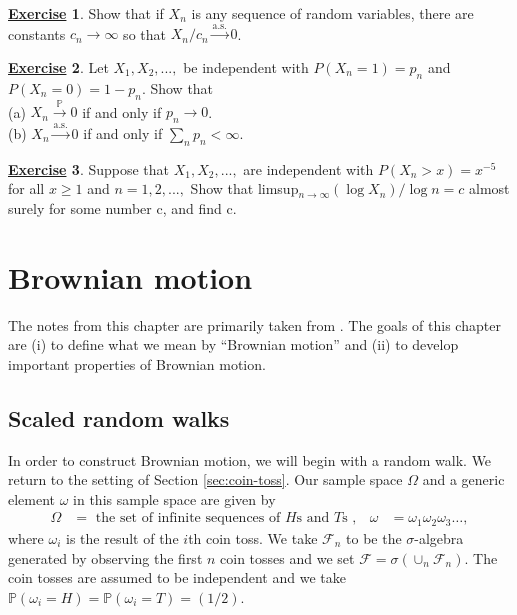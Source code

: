 \documentclass[12pt]{book}
\numberwithin{equation}{chapter}
\theoremstyle{plain}
\numberwithin{theorem}{section}
\theoremstyle{definition}
\newtheorem{exercise}{\underline{Exercise}}
\numberwithin{exercise}{chapter}
\newcommand{\<}{\langle}
\renewcommand{\>}{\rangle}
\renewcommand{\(}{\left(}
\renewcommand{\)}{\right)}
\renewcommand{\[}{\left[}
\renewcommand{\]}{\right]}
\newcommand\Pb{\mathds{P}}
\newcommand\Fc{\mathscr{F}}
\newcommand\om{\omega}
\newcommand\Om{\Omega}
\newcommand\sig{\sigma}
\begin{document}
\begin{exercise}
\label{exer:6.5}
Show that if $X_n$ is any sequence of random variables, there are constants $c_n \rightarrow \infty$ so that $X_n/c_n \stackrel{\text{a.s.}}{\rightarrow} 0$.  
\end{exercise}

\begin{exercise}
\label{exer:6.6}
Let $X_1, X_2, ...,$ be independent with $P(X_n = 1) = p_n$ and $P(X_n=0) = 1-p_n$. Show that\\
(a) $X_n \stackrel{\Pb}{\rightarrow} 0$ if and only if $p_n \rightarrow 0$.\\
(b) $X_n \stackrel{\text{a.s.}}{\rightarrow} 0$ if and only if $\sum_n p_n < \infty $.
\end{exercise}

\begin{exercise}
\label{exer:6.7}
Suppose that $X_1, X_2, ..., $ are independent with $P(X_n > x) = x^{-5}$ for all $x\geq 1$ and $n = 1,2, ...,$ Show that  limsup$_{n\rightarrow \infty} (\log X_n)/ \log n = c$ almost surely for some number c, and find c. 
\end{exercise}

%
%


\chapter{Brownian motion}
\label{chapter:bm}
The notes from this chapter are primarily taken from \cite[Chapter 3]{shreve2004}.  The goals of this chapter are (i) to define what we mean by ``Brownian motion'' and (ii) to develop important properties of Brownian motion.


\section{Scaled random walks}
\label{sec:random.walks}
In order to construct Brownian motion, we will begin with a random walk.  We return to the setting of Section \ref{sec:coin-toss}.  Our sample space $\Om$ and a generic element $\om$ in this sample space are given by
\begin{align}
\Om
	&=	\text{ the set of infinite sequences of $H$s and $T$s }, &
\om
	&=	\om_1 \om_2 \om_3 \ldots ,
\end{align}
where $\om_i$ is the result of the $i$th coin toss.  We take $\Fc_n$ to be the $\sig$-algebra generated by observing the first $n$ coin tosses and we set $\Fc = \sig( \cup_n \Fc_n)$.  The coin tosses are assumed to be independent and we take $\Pb(\om_i = H) = \Pb(\om_i = T) = (1/2)$.
\end{document}
